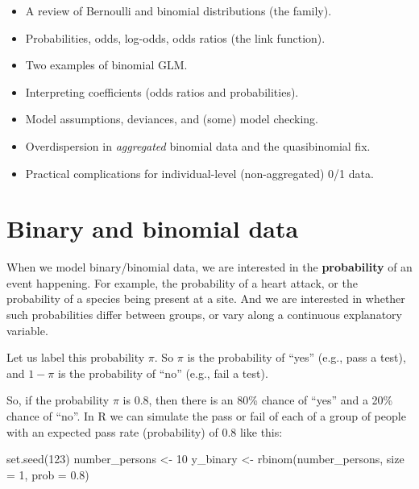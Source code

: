 \documentclass[
  letterpaper,
  8pt,
  a4paper]{book}
\newenvironment{Shaded}{\begin{snugshade}}{\end{snugshade}}
\newcommand{\AttributeTok}[1]{\textcolor[rgb]{0.40,0.45,0.13}{#1}}
\newcommand{\DecValTok}[1]{\textcolor[rgb]{0.68,0.00,0.00}{#1}}
\newcommand{\FloatTok}[1]{\textcolor[rgb]{0.68,0.00,0.00}{#1}}
\newcommand{\FunctionTok}[1]{\textcolor[rgb]{0.28,0.35,0.67}{#1}}
\newcommand{\NormalTok}[1]{\textcolor[rgb]{0.00,0.23,0.31}{#1}}
\newcommand{\OtherTok}[1]{\textcolor[rgb]{0.00,0.23,0.31}{#1}}
\providecommand{\tightlist}{%
  \setlength{\itemsep}{0pt}\setlength{\parskip}{0pt}}
\begin{document}
\begin{itemize}
\tightlist
\item
  A review of Bernoulli and binomial distributions (the family).
\item
  Probabilities, odds, log-odds, odds ratios (the link function).
\item
  Two examples of binomial GLM.
\item
  Interpreting coefficients (odds ratios and probabilities).
\item
  Model assumptions, deviances, and (some) model checking.
\item
  Overdispersion in \emph{aggregated} binomial data and the
  quasibinomial fix.
\item
  Practical complications for individual-level (non-aggregated) 0/1
  data.
\end{itemize}

\section*{Binary and binomial data}\label{binary-and-binomial-data}


When we model binary/binomial data, we are interested in the
\textbf{probability} of an event happening. For example, the probability
of a heart attack, or the probability of a species being present at a
site. And we are interested in whether such probabilities differ between
groups, or vary along a continuous explanatory variable.

Let us label this probability \(\pi\). So \(\pi\) is the probability of
``yes'' (e.g., pass a test), and \(1-\pi\) is the probability of ``no''
(e.g., fail a test).

So, if the probability \(\pi\) is 0.8, then there is an 80\% chance of
``yes'' and a 20\% chance of ``no''. In R we can simulate the pass or
fail of each of a group of people with an expected pass rate
(probability) of 0.8 like this:

\begin{Shaded}
\begin{Highlighting}[]
\FunctionTok{set.seed}\NormalTok{(}\DecValTok{123}\NormalTok{)}
\NormalTok{number\_persons }\OtherTok{\textless{}{-}} \DecValTok{10}
\NormalTok{y\_binary }\OtherTok{\textless{}{-}} \FunctionTok{rbinom}\NormalTok{(number\_persons, }\AttributeTok{size =} \DecValTok{1}\NormalTok{, }\AttributeTok{prob =} \FloatTok{0.8}\NormalTok{)}
\end{Highlighting}
\end{Shaded}
\end{document}
